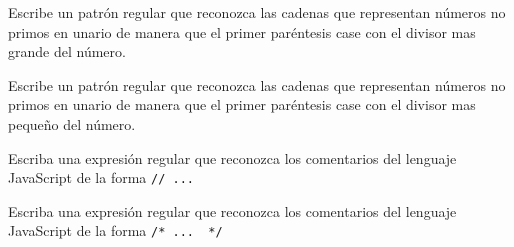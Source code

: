 \item
Escribe un patrón regular
que reconozca las cadenas  que representan números no primos en unario
de manera que el primer paréntesis case con el divisor mas grande del número.

\item
Escribe un patrón regular
que reconozca las cadenas  que representan números no primos en unario
de manera que el primer paréntesis case con el divisor mas pequeño del número.

\item Escriba una expresión regular que reconozca los comentarios del lenguaje JavaScript de la forma
\verb|// ...  |

\item Escriba una expresión regular que reconozca los comentarios del lenguaje JavaScript de la forma
\verb|/* ...  */|


